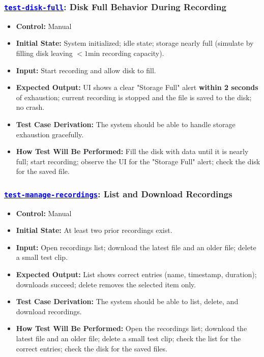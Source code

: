 \documentclass[12pt, titlepage]{article}
\newcommand{\tid}[1]{\hyperlink{tid:#1}{\textcolor{blue}{\texttt{#1}}}}
\begin{document}
\subsubsection*{\tid{test-disk-full}: Disk Full Behavior During Recording}
\begin{itemize}
  \item \textbf{Control:} Manual
  \item \textbf{Initial State:} System initialized; idle state; storage nearly full (simulate by filling disk leaving $<1$min recording capacity).
  \item \textbf{Input:} Start recording and allow disk to fill.
  \item \textbf{Expected Output:} UI shows a clear "Storage Full" alert \textbf{within 2 seconds} of exhaustion; current recording is stopped and the file is saved to the disk; no crash.
  \item \textbf{Test Case Derivation:} The system should be able to handle storage exhaustion gracefully.
  \item \textbf{How Test Will Be Performed:} Fill the disk with data until it is nearly full; start recording; observe the UI for the "Storage Full" alert; check the disk for the saved file.
\end{itemize}

\subsubsection*{\tid{test-manage-recordings}: List and Download Recordings}
\begin{itemize}
  \item \textbf{Control:} Manual
  \item \textbf{Initial State:} At least two prior recordings exist.
  \item \textbf{Input:} Open recordings list; download the latest file and an older file; delete a small test clip.
  \item \textbf{Expected Output:} List shows correct entries (name, timestamp, duration); downloads succeed; delete removes the selected item only.
  \item \textbf{Test Case Derivation:} The system should be able to list, delete, and download recordings.
  \item \textbf{How Test Will Be Performed:} Open the recordings list; download the latest file and an older file; delete a small test clip; check the list for the correct entries; check the disk for the saved files.
\end{itemize}
\end{document}

